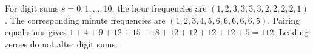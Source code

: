 For digit sums $s=0,1,\ldots,10$, the hour frequencies are $(1,2,3,3,3,3,2,2,2,2,1)$. The corresponding minute frequencies are $(1,2,3,4,5,6,6,6,6,6,5)$. Pairing equal sums gives $1+4+9+12+15+18+12+12+12+12+5=\boxed{112}$. Leading zeroes do not alter digit sums.
